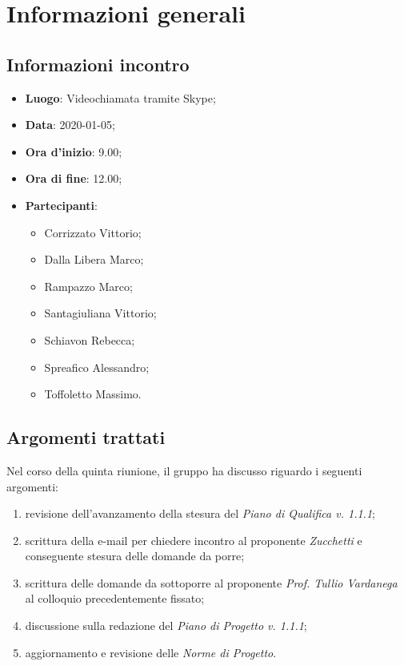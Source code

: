 \section{Informazioni generali}
    \subsection{Informazioni incontro}
        \begin{itemize}
            \item \textbf{Luogo}: Videochiamata tramite Skype;
            \item \textbf{Data}: 2020-01-05;
            \item \textbf{Ora d'inizio}: 9.00;
            \item \textbf{Ora di fine}: 12.00;
            \item \textbf{Partecipanti}: \begin{itemize}
                \item Corrizzato Vittorio;
                \item Dalla Libera Marco;
                \item Rampazzo Marco;
                \item Santagiuliana Vittorio;
                \item Schiavon Rebecca;
                \item Spreafico Alessandro;
                \item Toffoletto Massimo.
            \end{itemize}
        \end{itemize}
    \subsection{Argomenti trattati}
        Nel corso della quinta riunione, il gruppo ha discusso riguardo i seguenti argomenti:
        \begin{enumerate}
            \item revisione dell'avanzamento della stesura del \textit{Piano di Qualifica v. 1.1.1}; 
            \item scrittura della e-mail per chiedere incontro al proponente \textit{Zucchetti} e conseguente stesura delle domande da porre;
            \item scrittura delle domande da sottoporre al proponente \textit{Prof. Tullio Vardanega} al colloquio precedentemente fissato;
            \item discussione sulla redazione del \textit{Piano di Progetto v. 1.1.1};
            \item aggiornamento e revisione delle \textit{Norme di Progetto}.
        \end{enumerate}

